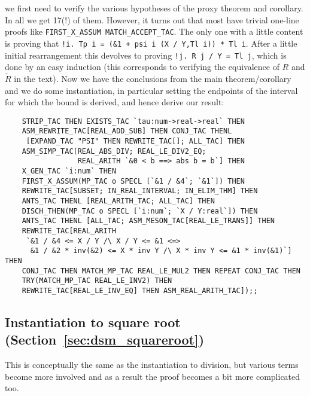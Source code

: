 \documentclass[10pt]{article}
\theoremstyle{definition}
\theoremstyle{remark}
\numberwithin{equation}{section}
\begin{document}
\noindent we first need to verify the various hypotheses of the proxy theorem
and corollary. In all we get 17(!) of them. However, it turns out that
most have trivial one-line
proofs like {\verb|FIRST_X_ASSUM MATCH_ACCEPT_TAC|}. The only one with a little
content is proving that {\verb|!i. Tp i = (&1 + psi i (X / Y,Tl i)) * Tl i|}.
After a little initial rearrangement this devolves to proving
{\verb|!j. R j / Y = Tl j|}, which is done by an easy induction (this
corresponds to verifying the equivalence of $R$ and $\tilde{R}$ in the text).
Now we have the conclusions from the main theorem/corollary and we do some
instantiation, in particular setting the endpoints of the interval for which
the bound is derived, and hence derive our result:

\begin{scriptsize}\begin{verbatim}
    STRIP_TAC THEN EXISTS_TAC `tau:num->real->real` THEN
    ASM_REWRITE_TAC[REAL_ADD_SUB] THEN CONJ_TAC THENL
     [EXPAND_TAC "PSI" THEN REWRITE_TAC[]; ALL_TAC] THEN
    ASM_SIMP_TAC[REAL_ABS_DIV; REAL_LE_DIV2_EQ;
                 REAL_ARITH `&0 < b ==> abs b = b`] THEN
    X_GEN_TAC `i:num` THEN
    FIRST_X_ASSUM(MP_TAC o SPECL [`&1 / &4`; `&1`]) THEN
    REWRITE_TAC[SUBSET; IN_REAL_INTERVAL; IN_ELIM_THM] THEN
    ANTS_TAC THENL [REAL_ARITH_TAC; ALL_TAC] THEN
    DISCH_THEN(MP_TAC o SPECL [`i:num`; `X / Y:real`]) THEN
    ANTS_TAC THENL [ALL_TAC; ASM_MESON_TAC[REAL_LE_TRANS]] THEN
    REWRITE_TAC[REAL_ARITH
     `&1 / &4 <= X / Y /\ X / Y <= &1 <=>
      &1 / &2 * inv(&2) <= X * inv Y /\ X * inv Y <= &1 * inv(&1)`] THEN
    CONJ_TAC THEN MATCH_MP_TAC REAL_LE_MUL2 THEN REPEAT CONJ_TAC THEN
    TRY(MATCH_MP_TAC REAL_LE_INV2) THEN
    REWRITE_TAC[REAL_LE_INV_EQ] THEN ASM_REAL_ARITH_TAC]);;
\end{verbatim}\end{scriptsize}

\subsection{Instantiation to square root (Section~\ref{sec:dsm_squareroot})}

This is conceptually the same as the instantiation to division, but various
terms become more involved and as a result the proof becomes a bit more
complicated too.
\end{document}
